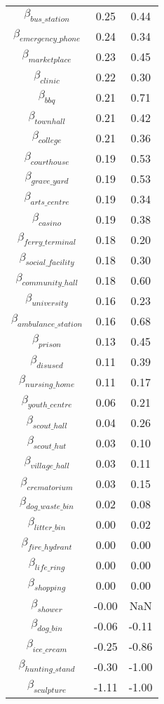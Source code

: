 \begin{tabular}{c|cc}
$\beta_{bus\_station}$ & 0.25 & 0.44 \\
$\beta_{emergency\_phone}$ & 0.24 & 0.34 \\
$\beta_{marketplace}$ & 0.23 & 0.45 \\
$\beta_{clinic}$ & 0.22 & 0.30 \\
$\beta_{bbq}$ & 0.21 & 0.71 \\
$\beta_{townhall}$ & 0.21 & 0.42 \\
$\beta_{college}$ & 0.21 & 0.36 \\
$\beta_{courthouse}$ & 0.19 & 0.53 \\
$\beta_{grave\_yard}$ & 0.19 & 0.53 \\
$\beta_{arts\_centre}$ & 0.19 & 0.34 \\
$\beta_{casino}$ & 0.19 & 0.38 \\
$\beta_{ferry\_terminal}$ & 0.18 & 0.20 \\
$\beta_{social\_facility}$ & 0.18 & 0.30 \\
$\beta_{community\_hall}$ & 0.18 & 0.60 \\
$\beta_{university}$ & 0.16 & 0.23 \\
$\beta_{ambulance\_station}$ & 0.16 & 0.68 \\
$\beta_{prison}$ & 0.13 & 0.45 \\
$\beta_{disused}$ & 0.11 & 0.39 \\
$\beta_{nursing\_home}$ & 0.11 & 0.17 \\
$\beta_{youth\_centre}$ & 0.06 & 0.21 \\
$\beta_{scout\_hall}$ & 0.04 & 0.26 \\
$\beta_{scout\_hut}$ & 0.03 & 0.10 \\
$\beta_{village\_hall}$ & 0.03 & 0.11 \\
$\beta_{crematorium}$ & 0.03 & 0.15 \\
$\beta_{dog\_waste\_bin}$ & 0.02 & 0.08 \\
$\beta_{litter\_bin}$ & 0.00 & 0.02 \\
$\beta_{fire\_hydrant}$ & 0.00 & 0.00 \\
$\beta_{life\_ring}$ & 0.00 & 0.00 \\
$\beta_{shopping}$ & 0.00 & 0.00 \\
$\beta_{shower}$ & -0.00 & NaN \\
$\beta_{dog\_bin}$ & -0.06 & -0.11 \\
$\beta_{ice\_cream}$ & -0.25 & -0.86 \\
$\beta_{hunting\_stand}$ & -0.30 & -1.00 \\
$\beta_{sculpture}$ & -1.11 & -1.00 \\
\hline
\end{tabular}
